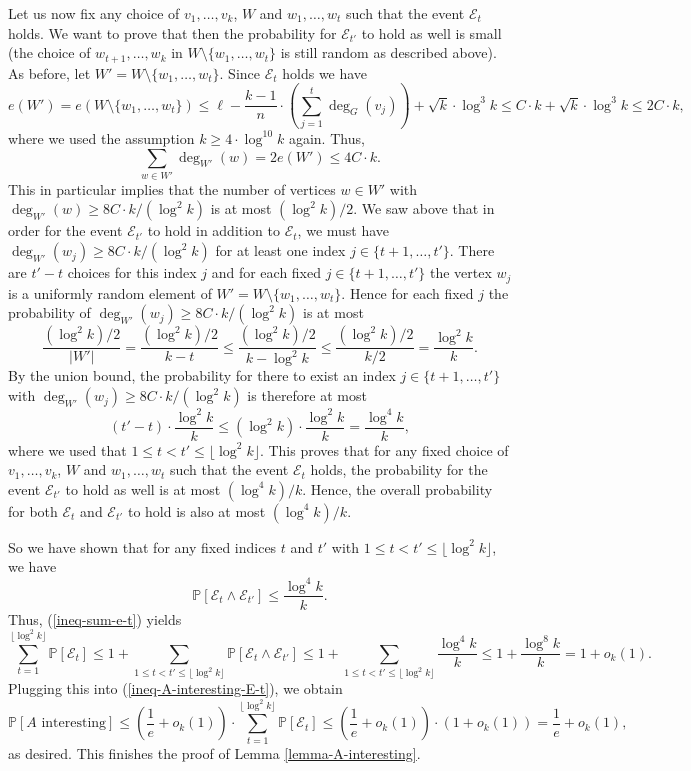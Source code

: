 Let us now fix any choice of $v_1,\dots,v_k$, $W$ and $w_1,\dots,w_t$ such that the event $\mathscr{E}_t$ holds. We want to prove that then the probability for $\mathscr{E}_{t'}$ to hold as well is small (the choice of $w_{t+1},\dots,w_k$ in $W\setminus \lbrace w_1,\dots,w_t\rbrace$ is still random as described above). As before, let $W'=W\setminus \lbrace w_1,\dots,w_t\rbrace$. Since $\mathscr{E}_t$ holds we have
\[e(W')=e(W\setminus \lbrace w_1,\dots,w_t\rbrace)\leq \ell-\frac{k-1}{n}\cdot\left(\sum_{j=1}^{t}\deg_G(v_j)\right)+\sqrt{k}\cdot \log^3 k\leq C\cdot k+\sqrt{k}\cdot \log^3 k\leq 2C\cdot k,\]
where we used the assumption $k\geq 4\cdot \log^{10} k$ again. Thus,
\[\sum_{w\in W'}\deg_{W'}(w)=2e(W')\leq 4C\cdot k.\]
This in particular implies that the number of vertices $w\in W'$ with $\deg_{W'}(w)\geq 8C\cdot k/(\log^2 k)$ is at most $(\log^2 k)/2$. We saw above that in order for the event $\mathscr{E}_{t'}$ to hold in addition to $\mathscr{E}_{t}$, we must have $\deg_{W'}(w_j)\geq 8C\cdot k/(\log^2 k)$ for at least one index $j\in \lbrace t+1,\dots,t'\rbrace$. There are $t'-t$ choices for this index $j$ and for each fixed $j\in \lbrace t+1,\dots,t'\rbrace$ the vertex $w_j$ is a uniformly random element of $W'=W\setminus \lbrace w_1,\dots,w_t\rbrace$. Hence for each fixed $j$ the probability of $\deg_{W'}(w_j)\geq 8C\cdot k/(\log^2 k)$ is at most
\[\frac{(\log^2 k)/2}{\vert W'\vert}=\frac{(\log^2 k)/2}{k-t}\leq \frac{(\log^2 k)/2}{k-\log^2 k}\leq \frac{(\log^2 k)/2}{k/2}=\frac{\log^2 k}{k}.\]
By the union bound, the probability for there to exist an index $j\in \lbrace t+1,\dots,t'\rbrace$ with $\deg_{W'}(w_j)\geq 8C\cdot k/(\log^2 k)$ is therefore at most
\[(t'-t)\cdot \frac{\log^2 k}{k}\leq (\log^2 k)\cdot \frac{\log^2 k}{k}=\frac{\log^4 k}{k},\]
where we used that $1\leq t<t'\leq \lfloor\log^2 k\rfloor$. This proves that for any fixed choice of $v_1,\dots,v_k$, $W$ and $w_1,\dots,w_t$ such that the event $\mathscr{E}_t$ holds, the probability for the event $\mathscr{E}_{t'}$ to hold as well is at most $(\log^4 k)/k$. Hence, the overall probability for both $\mathscr{E}_t$ and $\mathscr{E}_{t'}$ to hold is also at most $(\log^4 k)/k$.

So we have shown that for any fixed indices $t$ and $t'$ with $1\leq t<t'\leq \lfloor\log^2 k\rfloor$, we have
\[\mathbb{P}[\mathscr{E}_t\wedge\mathscr{E}_{t'}]\leq \frac{\log^4 k}{k}.\]
Thus, (\ref{ineq-sum-e-t}) yields
\[\sum_{t=1}^{\lfloor\log^2 k\rfloor} \mathbb{P}[\mathscr{E}_t]\leq 1+\sum_{1\leq t<t'\leq \lfloor\log^2 k\rfloor}\mathbb{P}[\mathscr{E}_t\wedge\mathscr{E}_{t'}]\leq 1+\sum_{1\leq t<t'\leq \lfloor\log^2 k\rfloor}\frac{\log^4 k}{k}\leq 1+\frac{\log^8 k}{k}=1+o_k(1).\]
Plugging this into (\ref{ineq-A-interesting-E-t}), we obtain
\[\mathbb{P}\left[A\text{ interesting}\right]\leq \left(\frac{1}{e}+o_k(1)\right)\cdot \sum_{t=1}^{\lfloor\log^2 k\rfloor} \mathbb{P}[\mathscr{E}_t]\leq \left(\frac{1}{e}+o_k(1)\right)\cdot (1+o_k(1))=\frac{1}{e}+o_k(1),\]
as desired. This finishes the proof of Lemma \ref{lemma-A-interesting}.


